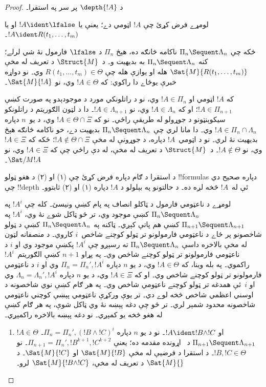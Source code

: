 \documentclass[../../../include/open-logic-section]{subfiles}
\begin{document}
\begin{proof}
  د $\depth{!A}$ پر سر په استقرا۔

لومړے فرض کړئ چې $!A$ اټومي دے؛ يعنې يا
$!A \ident \lfalse$ او يا $!A \ident R(t_1, \dots, t_m)$۔

ځکه چې $\Pi_n \Sequent \Lambda_n$ ناکامه څانګه ده، هېڅ
$\Pi_n$ د $\lfalse$ فارمول نۀ شي لرلے؛ کنه
$\Pi_n \Sequent \Lambda_n$ به بديهيت و۔ د~$\Struct{M}$ د
تعريف له مخې $\Sat{M}{R(t_1, \dots, t_m)}$ هله او يوازې هله
چې $R(t_1, \dots, t_m) \in \Theta$ وي۔ نو دواړه خبرې يوځاے
دا راکوي: که $!A \in \Theta$ وي، نو $\Sat{M}{!A}$۔

که $!A$ اټومي او $!A \in \Pi_n$ وي، نو د راتلونکي
مورد د موجودېدو په صورت کښې $!A \in \Pi_{n+1}$؛ او که
$!A \in \Lambda_n$ وي، نو $!A \in \Lambda_{n+1}$۔ دا د لټون
الګوريتم د راتلونکو سيکوېنټونو د جوړولو له طريقې راځي۔ نو
که $!A \in \Theta \cap \Xi$ وي، د يو~$n$ دپاره
$!A \in \Pi_n \cap \Lambda_n$ وي۔ دا مانا لري چې
$\Pi_n \Sequent \Lambda_n$ بديهيت دے، خو ناکامه څانګه هېڅ
بديهيت نۀ لري۔ نو د اټومي~$!A$ دپاره، د جوړونې له مخې
$!A \notin \Theta \cap \Xi$؛ ځکه که $!A \in \Xi$ وي، نو
$!A \notin \Theta$۔ د~$\Struct{M}$ د تعريف له مخې، له دې
راځي چې که $!A \in \Xi$ وي، نو $\Sat/{M}{!A}$۔

د استقرا د ګام دپاره فرض کړئ چې (۱) او (۲) د هغو ټولو
!!{formula}s دپاره صحيح دي چې !!{depth} ئې له~$!A$ څخه لږه
ده۔ د حالتونو په بېلولو د $!A$ دپاره (۱) او (۲) ثابتوو۔

لومړے د ناعټومي فارمول د ټاکلو انصاف په پام کښې ونيسئ۔
کله چې $!A^i$ په $\Pi_n \Sequent \Lambda_n$ کښې موجود وي،
تر څو ټاکل شوے نۀ وي، $!A^i$ په
$\Pi_{n+1} \Sequent \Lambda_{n+1}$ کښې هم پاتې کېږي۔ ټاکنه
په $\Pi_n \Sequent \Lambda_n$ کښې د ټولو شاخصونو پر ځاے د ناعټومي فارمولونو تر ټولو کوچنے
شاخص~$i$ کاروي۔ د منصفانه لټون له مخې بالاخره داسې
$\Pi_n \Sequent \Lambda_n$ ته رسېږو چې $!A^i$ پکښې موجود
وي او $i$ د ناعټومي فارمولونو تر ټولو کوچنے شاخص وي۔ په
پړاو $n+1$ کښې الګوريتم~$!A^i$ راکموي۔ په بله وينا، که
$!A \in \Theta$ وي، د يو $n$ دپاره $\Pi_n = \Pi_n', !A^i$
وي او $i$ د ناعټومي فارمولونو تر ټولو کوچنے شاخص وي۔ او
که $!A \in \Xi$ وي، د يو $n$ دپاره
$\Lambda_n = \Lambda_n', !A^i$ وي او $i$~ئې همدغه تر ټولو
کوچنے ناعټومي شاخص وي۔ په هر ګام کښې نوي شاخصونه د اوسني اعظمي شاخص څخه لوے دي۔ تر يوې ورکړې ناعټومي پېښې کوچني ناعټومي شاخصونه محدود شمېر لري۔ تر څو چې دغه پېښه نۀ وي ټاکل شوې، په هر ګام کښې له هغو څخه يو کمېږي۔ نو دغه پېښه بالاخره راکمېږي۔

\begin{enumerate}
  \item $!A \in \Theta$ او $!A \ident !B \land !C$۔ نو د يو
  $n$ دپاره $\Pi_n = \Pi_n', (!B \land !C)^i$۔
  $\Pi_{n+1} \Sequent \Lambda_{n+1}$ د~\LeftR{\land} اړونده
  مقدمه ده؛ يعنې $\Pi_{n+1} = \Pi_n', !B^{k+1}, !C^{k+2}$۔ نو
  $!B, !C \in \Theta$۔ د استقرا د فرضيې له مخې
  $\Sat{M}{!B}$ او $\Sat{M}{!C}$۔ د $\Sat{M}{}$ د تعريف له
  مخې، $\Sat{M}{!B \land !C}$ لرو۔


\end{enumerate}
\end{proof}
\end{document}
